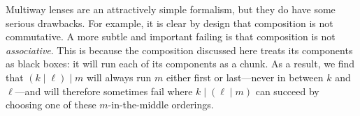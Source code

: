 Multiway lenses are an attractively simple formalism, but they do have some
serious drawbacks. For example, it is clear by design that composition is
not commutative. A more subtle and important failing is that composition is
not \emph{associative}. This is because the composition discussed here
treats its components as black boxes: it will run each of its components as
a chunk. As a result, we find that $(k \mid \ell) \mid m$ will always run
$m$ either first or last---never in between $k$ and $\ell$---and will
therefore sometimes fail where $k \mid (\ell \mid m)$ can succeed by
choosing one of these $m$-in-the-middle orderings.

%
%
%
%

